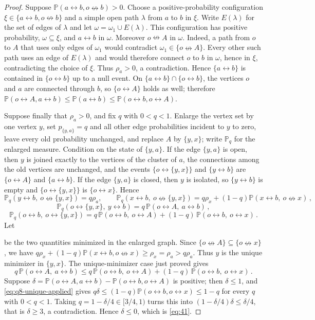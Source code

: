 \documentclass[11pt]{article}
\theoremstyle{definition}
\theoremstyle{remark}
\newcommand{\PP}{\mathbb P}
\newcommand{\con}{\leftrightarrow}
\newcommand{\ncon}{\nleftrightarrow}
\begin{document}
\begin{proof}
Suppose $\PP(a\con b,o\ncon b)>0$. Choose a positive-probability configuration
$\xi\in\{a\con b,o\ncon b\}$ and a simple open path $\lambda$ from $a$ to $b$ in $\xi$. Write
$E(\lambda)$ for the set of edges of $\lambda$ and let $\omega=\omega_1\cup E(\lambda)$. This configuration has positive probability,
$\omega\subseteq\xi$, and $a\con b$ in $\omega$. Moreover $o\ncon A$ in $\omega$. Indeed,
a path from $o$ to $A$ that uses only edges of $\omega_1$ would contradict
$\omega_1\in\{o\ncon A\}$. Every other such path uses an edge of $E(\lambda)$ and would therefore connect $o$ to $b$ in
$\omega$, hence in $\xi$, contradicting the choice of $\xi$. Thus $\rho_a>0$, a
contradiction. Hence $\{a\con b\}$ is contained in $\{o\con b\}$ up to a null event. On
$\{a\con b\}\cap\{o\con b\}$, the vertices $o$ and $a$ are connected through $b$, so
$\{o\con A\}$ holds as well; therefore $\PP(o\con A,a\con b)\leq\PP(a\con b)\leq\PP(o\con
b,o\con A)$.

Suppose finally that $\rho_a>0$, and fix $q$ with $0<q<1$. Enlarge the vertex set by one
vertex $y$, set $p_{\{y,a\}}=q$ and all other edge probabilities incident to $y$ to zero,
leave every old probability unchanged, and replace $A$ by $\{y,x\}$; write $\PP_q$ for the
enlarged measure. Condition on the state of $\{y,a\}$. If the edge $\{y,a\}$ is open, then $y$ is
joined exactly to the vertices of the cluster of $a$, the connections among the old
vertices are unchanged, and the events $\{o\con\{y,x\}\}$ and $\{y\con b\}$ are $\{o\con
A\}$ and $\{a\con b\}$. If the edge $\{y,a\}$ is closed, then $y$ is isolated, so $\{y\con b\}$ is empty
and $\{o\con\{y,x\}\}$ is $\{o\con x\}$. Hence
\[
 \PP_q(y\con b,\ o\ncon\{y,x\})=q\rho_a,\qquad
 \PP_q(x\con b,\ o\ncon\{y,x\})=q\rho_x+(1-q)\PP(x\con b,\ o\ncon x)\,,
\]
\[
 \PP_q(o\con\{y,x\},\ y\con b)=q\,\PP(o\con A,\ a\con b)\,,
\]
\[
 \PP_q(o\con b,\ o\con\{y,x\})=q\,\PP(o\con b,\ o\con A)+(1-q)\,\PP(o\con b,\ o\con x)\,.
\]
Let

be the two quantities minimized in the enlarged graph. Since
$\{o\ncon A\}\subseteq\{o\ncon x\}$, we have
$q\rho_x+(1-q)\PP(x\con b,o\ncon x)\geq\rho_x=\rho_a>q\rho_a$. Thus $y$ is the unique
minimizer in $\{y,x\}$.
The unique-minimizer case just proved gives
\begin{equation}\label{eq:q8-unique-applied}
 q\,\PP(o\con A,\ a\con b)\leq q\,\PP(o\con b,\ o\con A)+(1-q)\,\PP(o\con b,\ o\con x)\,.
\end{equation}
Suppose $\delta=\PP(o\con A,a\con b)-\PP(o\con b,o\con A)$ is positive; then $\delta\leq1$,
and \eqref{eq:q8-unique-applied} gives
$q\delta\leq(1-q)\PP(o\con b,o\con x)\leq1-q$ for every $q$ with $0<q<1$. Taking
$q=1-\delta/4\in[3/4,1)$ turns this into
$(1-\delta/4)\delta\leq\delta/4$, that is $\delta\geq3$, a contradiction. Hence $\delta\leq0$,
which is \eqref{eq:41}.
\end{proof}
\end{document}
